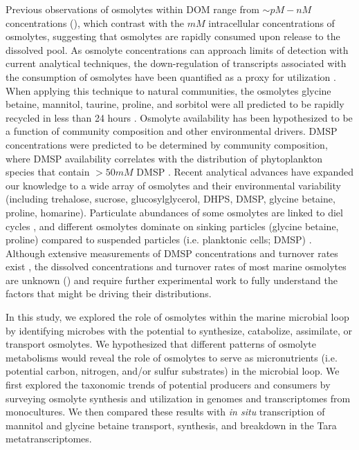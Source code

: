 \documentclass[utf8]{frontiersSCNS} %
\begin{document}
Previous observations of osmolytes within DOM range from $\sim pM - nM$ concentrations (), which  contrast with the $mM$ intracellular concentrations of osmolytes, suggesting that osmolytes are rapidly consumed upon release to the dissolved pool. As osmolyte concentrations can approach limits of detection with current analytical techniques, the down-regulation of transcripts associated with the consumption of osmolytes have been quantified as a proxy for utilization \citep{Vorobev2018}. When applying this technique to natural communities, the osmolytes glycine betaine, mannitol, taurine, proline, and sorbitol were all predicted to be rapidly recycled in less than 24 hours \citep{Vorobev2018}. Osmolyte availability has been hypothesized to be a function of community composition and other environmental drivers. DMSP concentrations were predicted to be determined by community composition, where DMSP availability correlates with the distribution of phytoplankton species that contain $> 50mM$ DMSP \citep{McParland2019}. Recent analytical advances have expanded our knowledge to a wide array of osmolytes and their environmental variability (including trehalose, sucrose, glucosylglycerol, DHPS, DMSP, glycine betaine, proline, homarine). Particulate abundances of some osmolytes are linked to diel cycles \citep{Boysen2020}, and different osmolytes dominate on sinking particles (glycine betaine, proline) compared to suspended particles (i.e. planktonic cells; DMSP) \citep{Johnson2020}. Although extensive measurements of DMSP concentrations and turnover rates exist \citep{Kiene2000}, the dissolved concentrations and turnover rates of most marine osmolytes are unknown  () and require further experimental work to fully understand the factors that might be driving their distributions.

In this study, we explored the role of osmolytes within the marine microbial loop by identifying microbes with the potential to synthesize, catabolize, assimilate, or transport osmolytes. We hypothesized that different patterns of osmolyte metabolisms would reveal the role of osmolytes to serve as micronutrients (i.e. potential carbon, nitrogen, and/or sulfur substrates) in the microbial loop. We first explored the taxonomic trends of potential producers and consumers by surveying osmolyte synthesis and utilization in genomes and transcriptomes from monocultures. We then compared these results with \emph{in situ} transcription of mannitol and glycine betaine transport, synthesis, and breakdown in the Tara metatranscriptomes. 
\end{document}

